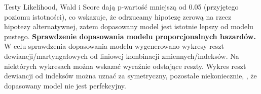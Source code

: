 \documentclass[]{article}
\begin{document}
Testy Likelihood, Wald i Score dają p-wartość mniejszą od 0.05
(przyjętego poziomu istotności), co wskazuje, że odrzucamy hipotezę
zerową na rzecz hipotezy alternatywnej, zatem dopasowany model jest
istotnie lepszy od modelu pustego. \newpage
\textbf{Sprawdzenie dopasowania modelu proporcjonalnych hazardów.}
\newline
W celu sprawdzenia dopasowania modelu wygenerowano wykresy reszt
dewiancji/martyngałowych od liniowej kombinacji zmiennych/indeksów. Na
niektórych wykresach można wskazać wyraźnie odstające reszty. Wykres
reszt dewiancji od indeksów można uznać za symetryczny, pozostałe
niekoniecznie, , że dopasowany model nie jest
perfekcyjny.

\begin{figure}[hbt!]
  \vspace{-10pt}
  \begin{center}

\end{center}
\end{figure}
\end{document}
